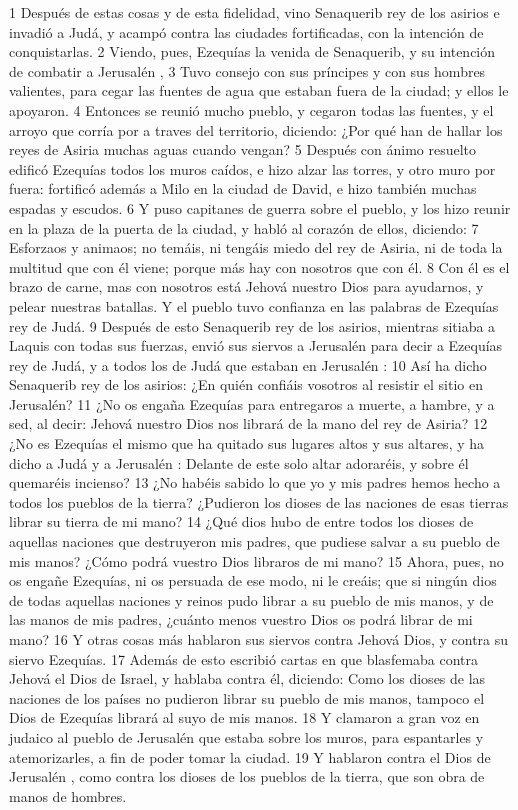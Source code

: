 1 Después de estas cosas y de esta fidelidad, vino Senaquerib rey de los asirios e invadió a Judá, y acampó contra las ciudades fortificadas, con la intención de conquistarlas.
2 Viendo, pues, Ezequías la venida de Senaquerib, y su intención de combatir a Jerusalén ,
3 Tuvo consejo con sus príncipes y con sus hombres valientes, para cegar las fuentes de agua que estaban fuera de la ciudad; y ellos le apoyaron.
4 Entonces se reunió mucho pueblo, y cegaron todas las fuentes, y el arroyo que corría por a traves del territorio, diciendo: ¿Por qué han de hallar los reyes de Asiria muchas aguas cuando vengan?
5 Después con ánimo resuelto edificó Ezequías todos los muros caídos, e hizo alzar las torres, y otro muro por fuera: fortificó además a Milo en la ciudad de David, e hizo también muchas espadas y escudos.
6 Y puso capitanes de guerra sobre el pueblo, y los hizo reunir en la plaza de la puerta de la ciudad, y habló al corazón de ellos, diciendo:
7 Esforzaos y animaos; no temáis, ni tengáis miedo del rey de Asiria, ni de toda la multitud que con él viene; porque más hay con nosotros que con él.
8 Con él es el brazo de carne, mas con nosotros está Jehová nuestro Dios para ayudarnos, y pelear nuestras batallas. Y el pueblo tuvo confianza en las palabras de Ezequías rey de Judá.
9 Después de esto Senaquerib rey de los asirios, mientras sitiaba a Laquis con todas sus fuerzas, envió sus siervos a Jerusalén para decir a Ezequías rey de Judá, y a todos los de Judá que estaban en Jerusalén :
10 Así ha dicho Senaquerib rey de los asirios: ¿En quién confiáis vosotros al resistir el sitio en Jerusalén?
11 ¿No os engaña Ezequías para entregaros a muerte, a hambre, y a sed, al decir: Jehová nuestro Dios nos librará de la mano del rey de Asiria?
12 ¿No es Ezequías el mismo que ha quitado sus lugares altos y sus altares, y ha dicho a Judá y a Jerusalén : Delante de este solo altar adoraréis, y sobre él quemaréis incienso?
13 ¿No habéis sabido lo que yo y mis padres hemos hecho a todos los pueblos de la tierra? ¿Pudieron los dioses de las naciones de esas tierras librar su tierra de mi mano?
14 ¿Qué dios hubo de entre todos los dioses de aquellas naciones que destruyeron mis padres, que pudiese salvar a su pueblo de mis manos? ¿Cómo podrá vuestro Dios libraros de mi mano?
15 Ahora, pues, no os engañe Ezequías, ni os persuada de ese modo, ni le creáis; que si ningún dios de todas aquellas naciones y reinos pudo librar a su pueblo de mis manos, y de las manos de mis padres, ¿cuánto menos vuestro Dios os podrá librar de mi mano?
16 Y otras cosas más hablaron sus siervos contra Jehová Dios, y contra su siervo Ezequías.
17 Además de esto escribió cartas en que blasfemaba contra Jehová el Dios de Israel, y hablaba contra él, diciendo: Como los dioses de las naciones de los países no pudieron librar su pueblo de mis manos, tampoco el Dios de Ezequías librará al suyo de mis manos.
18 Y clamaron a gran voz en judaico al pueblo de Jerusalén  que estaba sobre los muros, para espantarles y atemorizarles, a fin de poder tomar la ciudad.
19 Y hablaron contra el Dios de Jerusalén , como contra los dioses de los pueblos de la tierra, que son obra de manos de hombres.
